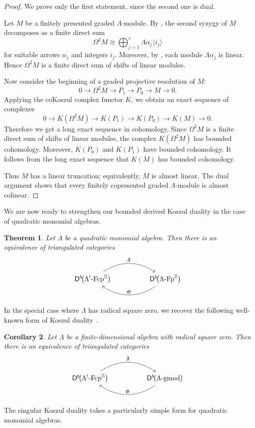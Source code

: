 \documentclass[11pt]{article}
\newtheorem{theorem}{Theorem}[section]
\newtheorem{corollary}[theorem]{Corollary}
\theoremstyle{definition}
\theoremstyle{remark}
\begin{document}
\begin{proof}
We prove only the first statement, since the second one is dual.

Let \(M\) be a finitely presented graded \(\Lambda\)-module. By
\cite[Lemme~3.2]{10}, the second syzygy of \(M\) decomposes as a finite direct
sum
\[
\Omega^{2}M \cong \bigoplus_{j=1}^{r} \Lambda \alpha_j\langle i_j\rangle
\]
for suitable arrows \(\alpha_j\) and integers \(i_j\). Moreover, by
\cite[Proposition~3.2]{10}, each module \(\Lambda \alpha_j\) is linear. Hence
\(\Omega^{2}M\) is a finite direct sum of shifts of linear modules.

Now consider the beginning of a graded projective resolution of \(M\):
\[
0 \longrightarrow \Omega^{2}M
\longrightarrow P_{1}
\longrightarrow P_{0}
\longrightarrow M
\longrightarrow 0 .
\]
Applying the coKoszul complex functor \(K\), we obtain an exact sequence of
complexes
\[
0 \longrightarrow K(\Omega^{2}M)
\longrightarrow K(P_{1})
\longrightarrow K(P_{0})
\longrightarrow K(M)
\longrightarrow 0 .
\]
Therefore we get a long exact sequence in cohomology. Since \(\Omega^{2}M\)
is a finite direct sum of shifts of linear modules, the complex
\(K(\Omega^{2}M)\) has bounded cohomology. Moreover, \(K(P_{0})\) and
\(K(P_{1})\) have bounded cohomology. It follows from the long exact sequence
that \(K(M)\) has bounded cohomology.

Thus \(M\) has a linear truncation; equivalently, \(M\) is almost linear. The
dual argument shows that every finitely copresented graded \(\Lambda\)-module
is almost colinear.
\end{proof}
We are now ready to strengthen our bounded derived Koszul duality in the case of
quadratic monomial algebras.

\begin{theorem}
Let \(\Lambda\) be a quadratic monomial algebra. Then there is an equivalence
of triangulated categories
\[
\begin{tikzcd}[column sep=huge]
\mathsf{D}^{b}\!\bigl(\Lambda^{!}\textup{-}\mathrm{Fcp}^{\mathbb{Z}}\bigr)
\arrow[r, bend left=35, "\mathfrak{F}"]
&
\mathsf{D}^{b}\!\bigl(\Lambda\textup{-}\mathrm{Fp}^{\mathbb{Z}}\bigr)
\arrow[l, bend left=35, "\mathfrak{G}"']
\end{tikzcd}
\]

\end{theorem}
In the special case where \(\Lambda\) has radical square zero, we recover the
following well-known form of Koszul duality~\cite{8}.

\begin{corollary}
Let \(\Lambda\) be a finite-dimensional algebra with radical square zero. Then
there is an equivalence of triangulated categories
\[
\begin{tikzcd}[column sep=huge]
\mathsf{D}^{b}\!\bigl(\Lambda^{!}\textup{-}\mathrm{Fcp}^{\mathbb{Z}}\bigr)
\arrow[r, bend left=35, "\mathfrak{F}"]
&
\mathsf{D}^{b}\!\bigl(\Lambda\textup{-}\mathrm{gmod}\bigr)
\arrow[l, bend left=35, "\mathfrak{G}"']
\end{tikzcd}
\]
\end{corollary}
The singular Koszul duality takes a particularly simple form for quadratic
monomial algebras.
\end{document}
